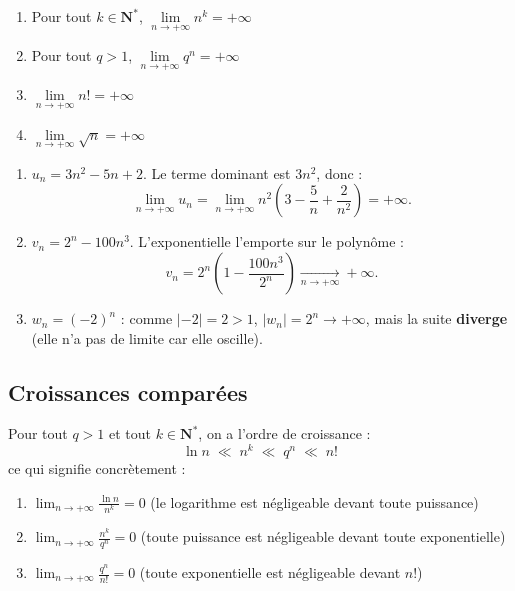 \documentclass[11pt,a4paper,openany]{book}
\theoremstyle{definition}
\begin{document}
    \begin{Propriété}
    \begin{enumerate}
        \item Pour tout $k\in\mathbf{N}^*$,
              $\lim\limits_{n\to+\infty}n^k=+\infty$
        \item Pour tout $q>1$,
              $\lim\limits_{n\to+\infty}q^n=+\infty$
        \item $\lim\limits_{n\to+\infty}n!=+\infty$
        \item $\lim\limits_{n\to+\infty}\sqrt{n}=+\infty$
    \end{enumerate}
    \end{Propriété}

    \begin{Exemple}
    \begin{enumerate}
        \item $u_n=3n^2-5n+2$. Le terme dominant est $3n^2$, donc :
              \[
                  \lim_{n\to+\infty}u_n
                  =\lim_{n\to+\infty}n^2\!\left(3-\frac{5}{n}+\frac{2}{n^2}\right)
                  =+\infty.
              \]
        \item $v_n=2^n-100n^3$. L'exponentielle l'emporte sur le polynôme :
              \[
                  v_n=2^n\!\left(1-\frac{100n^3}{2^n}\right)
                  \xrightarrow[n\to+\infty]{}+\infty.
              \]
        \item $w_n=(-2)^n$ : comme $|{-2}|=2>1$, $|w_n|=2^n\to+\infty$,
              mais la suite \textbf{diverge} (elle n'a pas de limite car elle oscille).
    \end{enumerate}
    \end{Exemple}

    \subsection{Croissances comparées}

    \begin{Propriété}
    Pour tout $q>1$ et tout $k\in\mathbf{N}^*$, on a l'ordre de croissance :
    \[
        \ln n \;\ll\; n^k \;\ll\; q^n \;\ll\; n!
    \]
    ce qui signifie concrètement :
    \begin{enumerate}
        \item $\displaystyle\lim_{n\to+\infty}\frac{\ln n}{n^k}=0$
              \quad (le logarithme est négligeable devant toute puissance)
        \item $\displaystyle\lim_{n\to+\infty}\frac{n^k}{q^n}=0$
              \quad (toute puissance est négligeable devant toute exponentielle)
        \item $\displaystyle\lim_{n\to+\infty}\frac{q^n}{n!}=0$
              \quad (toute exponentielle est négligeable devant $n!$)
    \end{enumerate}
    \end{Propriété}
\end{document}
